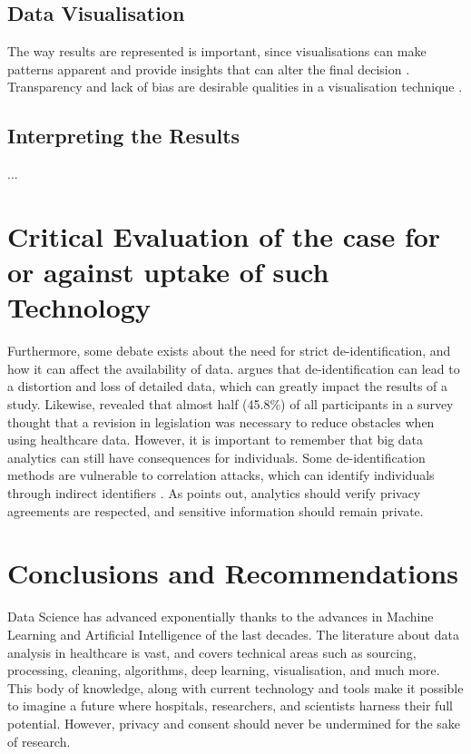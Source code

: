 \documentclass[a4paper,12pt]{article}
\begin{document}
\subsection{Data Visualisation}

The way results are represented is important, since visualisations can make patterns apparent and provide insights that can alter the final decision \parencite{Hendriks2019}.
Transparency and lack of bias are desirable qualities in a visualisation technique \parencite{Hendriks2019}.

\subsection{Interpreting the Results}

...

\section{Critical Evaluation of the case for or against uptake of such Technology}

Furthermore, some debate exists about the need for strict de-identification, and how it can affect the availability of data.
\textcite[2]{Shin2018} argues that de-identification can lead to a distortion and loss of detailed data, which can greatly impact the results of a study.
Likewise, \textcite{Kim2019} revealed that almost half (45.8\%) of all participants in a survey thought that a revision in legislation was necessary to reduce obstacles when using healthcare data.
However, it is important to remember that big data analytics can still have consequences for individuals.
Some de-identification methods are vulnerable to correlation attacks, which can identify individuals through indirect identifiers \parencite{Abouelmehdi2018}.
As \textcite{Abouelmehdi2018} points out, analytics should verify privacy agreements are respected, and sensitive information should remain private.



\section{Conclusions and Recommendations}

Data Science has advanced exponentially thanks to the advances in Machine
Learning and Artificial Intelligence of the last decades.
The literature about data analysis in healthcare is vast, and covers technical
areas such as sourcing, processing, cleaning, algorithms, deep learning,
visualisation, and much more.
This body of knowledge, along with current technology and tools make it
possible to imagine a future where hospitals, researchers, and scientists
harness their full potential.
However, privacy and consent should never be undermined for the sake of research.

\pagebreak
\printbibliography
\end{document}
